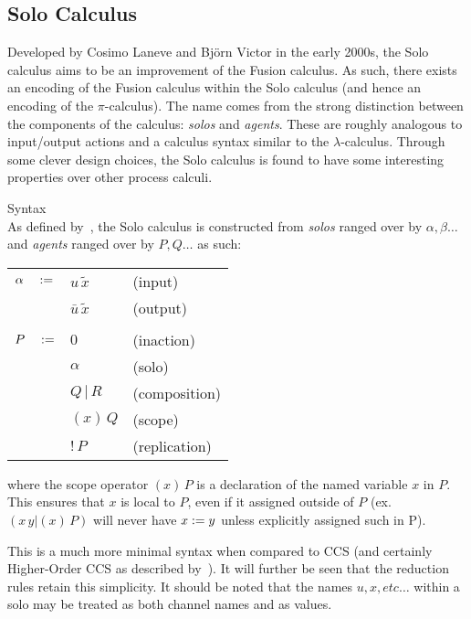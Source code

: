\subsection{Solo Calculus}

    Developed by Cosimo Laneve and Bj{\"o}rn Victor in the early 2000s, the Solo calculus aims to be an improvement of the Fusion calculus.
    As such, there exists an encoding of the Fusion calculus within the Solo calculus (and hence an encoding of the $\pi$-calculus).
    The name comes from the strong distinction between the components of the calculus: \textit{solos} and \textit{agents}.
    These are roughly analogous to input/output actions and a calculus syntax similar to the $\lambda$-calculus.
    Through some clever design choices, the Solo calculus is found to have some interesting properties over other process calculi.

    \begin{definition}{Syntax\\}
        \label{solo-calculus-syntax}
        As defined by~\cite{solo-calculus}, the Solo calculus is constructed from \textit{solos} ranged over by $\alpha, \beta \ldots$ and \textit{agents} ranged over by $P, Q \ldots$ as such:
        \begin{center}
            \begin{tabular}{ l l l }
                $\alpha \quad :=$   & $u \, \tilde{x}$          & (input) \\
                                        & $\bar{u} \, \tilde{x}$    & (output)~\footnotemark\\ \\
                $P \quad :=$        & $0$                       & (inaction) \\
                                        & $\alpha$                  & (solo) \\
                                        & $Q \, | \, R$             & (composition) \\
                                        & $(x) \, Q$                & (scope) \\
                                        & $!\,P$                    & (replication)
            \end{tabular}
        \end{center}
        where the scope operator $(x) \, P $ is a declaration of the named variable $x$ in $P$.
        This ensures that $x$ is local to $P$, even if it assigned outside of $P$ (ex. $(x \, y | (x) \, P)$ will never have $x := y$ unless explicitly assigned such in P).
    \end{definition}
    This is a much more minimal syntax when compared to CCS (and certainly Higher-Order CCS as described by~\cite{pi-calculus-in-ccs}).
    It will further be seen that the reduction rules retain this simplicity.
    It should be noted that the names $u, x, etc\ldots$ within a solo may be treated as both channel names and as values.


